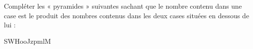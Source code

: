 
\begin{exercice}\label{exosmath-0756}

Compléter les « pyramides » suivantes sachant que le nombre contenu dans une case est le produit des nombres contenus dans les deux cases situées en dessous de lui :

SWHooJzpmlM

\end{exercice}
